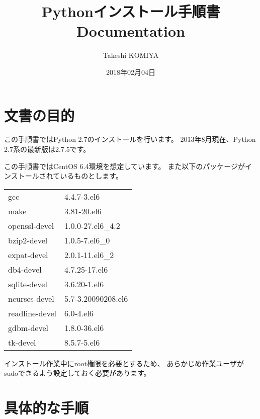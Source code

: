 \documentclass[letterpaper,10pt,dvipdfmx]{sphinxmanual}
\title{Pythonインストール手順書 Documentation}
\date{2018年02月04日}
\author{Takeshi KOMIYA}
\begin{document}
\maketitle
\sphinxtableofcontents
{}\label{\detokenize{index::doc}}



\chapter{文書の目的}
\label{\detokenize{purpose:id1}}\label{\detokenize{purpose:python-2-7}}\label{\detokenize{purpose::doc}}
この手順書ではPython 2.7のインストールを行います。
2013年8月現在、Python 2.7系の最新版は2.7.5です。

この手順書ではCentOS 6.4環境を想定しています。
また以下のパッケージがインストールされているものとします。


\begin{savenotes}\sphinxattablestart
\centering
{}
\label{\detokenize{purpose:id2}}
\sphinxaftercaption
\begin{tabulary}{\linewidth}[t]{|T|T|}
\hline
{}\relax &\relax \\
\hline
gcc
&
4.4.7-3.el6
\\
\hline
make
&
3.81-20.el6
\\
\hline
openssl-devel
&
1.0.0-27.el6\_4.2
\\
\hline
bzip2-devel
&
1.0.5-7.el6\_0
\\
\hline
expat-devel
&
2.0.1-11.el6\_2
\\
\hline
db4-devel
&
4.7.25-17.el6
\\
\hline
sqlite-devel
&
3.6.20-1.el6
\\
\hline
ncurses-devel
&
5.7-3.20090208.el6
\\
\hline
readline-devel
&
6.0-4.el6
\\
\hline
gdbm-devel
&
1.8.0-36.el6
\\
\hline
tk-devel
&
8.5.7-5.el6
\\
\hline
\end{tabulary}
\par
\sphinxattableend\end{savenotes}

インストール作業中にroot権限を必要とするため、
あらかじめ作業ユーザがsudoできるよう設定しておく必要があります。


\chapter{具体的な手順}
\label{\detokenize{procedure/index:id1}}\label{\detokenize{procedure/index::doc}}
\end{document}
